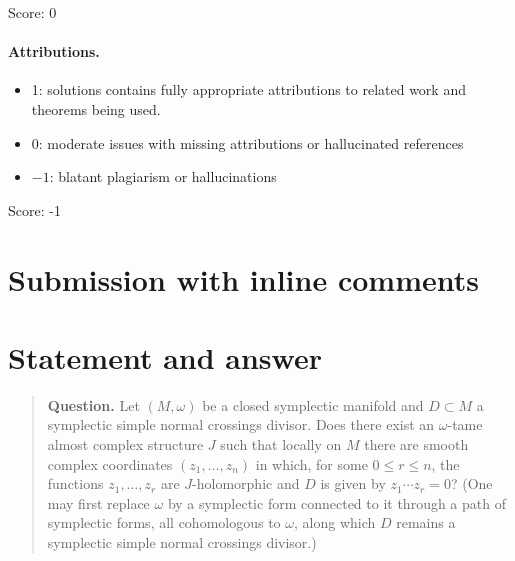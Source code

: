 \documentclass[11pt]{article}
\theoremstyle{definition}
\theoremstyle{remark}
\newcommand{\CP}{\mathbb{CP}}
\begin{document}
\noindent Score: 0

\paragraph{Attributions.}
\begin{itemize}
	\item  1: solutions contains fully appropriate attributions
		to related work and theorems being used.
	\item  0: moderate issues with missing attributions or hallucinated references
	\item  $-1$: blatant plagiarism or hallucinations
\end{itemize}

\noindent Score: -1

\newpage
\section{Submission with inline comments}


\begin{abstract}
\noindent We prove that the answer to the question is \emph{no} in
general. If $(M,\omega)$ is a symplectic manifold, $D\subset M$ a
symplectic simple normal crossings divisor, and $J$ an $\omega$-tame
almost complex structure admitting, locally on $M$, smooth complex
coordinates $(z_1,\ldots,z_n)$ with $z_1,\ldots,z_r$
$J$-holomorphic and $D=\{z_1\cdots z_r=0\}$, then the normal bundle
of every compact connected component $D_\alpha$ of $D$ admits a flat
structure with locally constant (locally) $J$-holomorphic trivialising
frames; in particular
\[
\langle e(\nu_{D_\alpha}),[D_\alpha]\rangle\ =\
D_\alpha\cdot D_\alpha\ =\ 0 .
\]
For a projective line $L\cong\CP^1$ in $(\CP^2,\omega_{\mathrm{FS}})$
(a symplectic SNC divisor with one component) one has $L\cdot L=1$,
so no such $J$ exists, and the cohomologous deformation of $\omega$
allowed in the question cannot remove the obstruction, which is
topological in the pair $(M,D)$.
\end{abstract}

\section{Statement and answer}\label{sec:statement}

\begin{quote}
\textbf{Question.} Let $(M,\omega)$ be a closed symplectic manifold
and $D\subset M$ a symplectic simple normal crossings divisor. Does
there exist an $\omega$-tame almost complex structure $J$ such that
locally on $M$ there are smooth complex coordinates $(z_1,\ldots,z_n)$
in which, for some $0\le r\le n$, the functions $z_1,\ldots,z_r$ are
$J$-holomorphic and $D$ is given by $z_1\cdots z_r=0$? (One may first
replace $\omega$ by a symplectic form connected to it through a path
of symplectic forms, all cohomologous to $\omega$, along which $D$
remains a symplectic simple normal crossings divisor.)
\end{quote}
\end{document}
